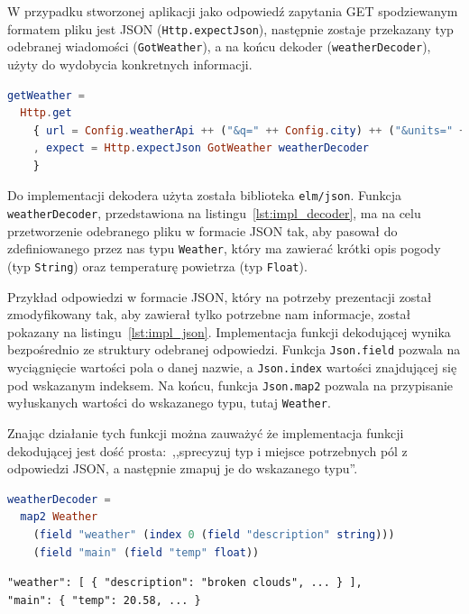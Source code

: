 \documentclass[twoside,a4paper]{report}
\begin{document}
W przypadku stworzonej aplikacji jako odpowiedź zapytania GET spodziewanym formatem pliku jest JSON (\texttt{Http.expectJson}), następnie zostaje przekazany typ odebranej wiadomości (\texttt{GotWeather}), a na końcu dekoder (\texttt{weatherDecoder}), użyty do wydobycia konkretnych informacji.
\begin{lstlisting}[mathescape,caption={Implementacja funkcji \texttt{getWeather}},label={lst:impl_weather},language={Elm}]
getWeather =
  Http.get
    { url = Config.weatherApi ++ ("&q=" ++ Config.city) ++ ("&units=" ++ Config.unit) ++ ("&appid=" ++ Config.apiKey)
    , expect = Http.expectJson GotWeather weatherDecoder
    }
\end{lstlisting}

Do implementacji dekodera użyta została biblioteka \texttt{elm/json}.
Funkcja \texttt{weatherDecoder}, przedstawiona na listingu~\ref{lst:impl_decoder}, ma na celu przetworzenie odebranego pliku w formacie JSON tak, aby pasował do zdefiniowanego przez nas typu \texttt{Weather}, który ma zawierać krótki opis pogody (typ \texttt{String}) oraz temperaturę powietrza (typ \texttt{Float}).

Przykład odpowiedzi w formacie JSON, który na potrzeby prezentacji został zmodyfikowany tak, aby zawierał tylko potrzebne nam informacje, został pokazany na listingu~\ref{lst:impl_json}.
Implementacja funkcji dekodującej wynika bezpośrednio ze struktury odebranej odpowiedzi.
Funkcja \texttt{Json.field} pozwala na wyciągnięcie wartości pola o danej nazwie, a \texttt{Json.index} wartości znajdującej się pod wskazanym indeksem.
Na końcu, funkcja \texttt{Json.map2} pozwala na przypisanie wyłuskanych wartości do wskazanego typu, tutaj \texttt{Weather}.

Znając działanie tych funkcji można zauważyć że implementacja funkcji dekodującej jest dość prosta:~,,sprecyzuj typ i miejsce potrzebnych pól z odpowiedzi JSON, a następnie zmapuj je do wskazanego typu''.

\begin{lstlisting}[mathescape,caption={Implementacja dekodera JSON},label={lst:impl_decoder},language={Elm}]
weatherDecoder =
  map2 Weather
    (field "weather" (index 0 (field "description" string)))
    (field "main" (field "temp" float))
\end{lstlisting}
\begin{lstlisting}[mathescape,caption={Odebrane zapytanie GET w formacie JSON},label={lst:impl_json}]
"weather": [ { "description": "broken clouds", ... } ],
"main": { "temp": 20.58, ... }
\end{lstlisting}
\end{document}
